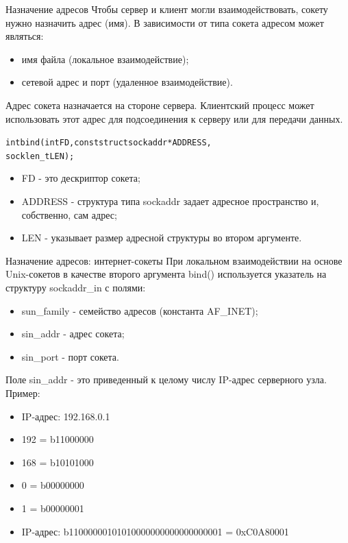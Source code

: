 \documentclass{beamer}
\begin{document}
\begin{frame}[fragile]{Назначение адресов}
	Чтобы сервер и клиент могли взаимодействовать, сокету нужно назначить адрес (имя). 
	В зависимости от типа сокета адресом может являться:
	\begin{itemize}
		\item имя файла (локальное взаимодействие);
		\item сетевой адрес и порт (удаленное взаимодействие).
	\end{itemize}
	Адрес сокета назначается на стороне сервера. 
	Клиентский процесс может использовать этот адрес для подсоединения к серверу или для передачи данных.
	\begin{alltt}
		int bind (int FD, const struct sockaddr * ADDRESS, 
		          socklen_t LEN);
	\end{alltt}
	\begin{itemize}
		\item FD - это дескриптор сокета;
		\item ADDRESS - структура типа sockaddr задает адресное пространство и, собственно, сам адрес;
		\item LEN - указывает размер адресной структуры во втором аргументе.		
	\end{itemize}
\end{frame}

\begin{frame}[fragile]{Назначение адресов: интернет-сокеты}
	При локальном взаимодействии на основе Unix-сокетов в качестве второго аргумента bind() используется указатель на структуру sockaddr\_in с полями: 
	\begin{itemize}
		\item sun\_family - семейство адресов (константа AF\_INET);
		\item sin\_addr - адрес сокета;
		\item sin\_port - порт сокета.
	\end{itemize}
	Поле sin\_addr - это приведенный к целому числу IP-адрес серверного узла. Пример:
	\begin{itemize}
		\item IP-адрес: 192.168.0.1
		\item 192 = b11000000		
		\item 168 = b10101000		
		\item   0 = b00000000		
		\item   1 = b00000001						
		\item IP-адрес: b11000000101010000000000000000001 = 0xC0A80001
	\end{itemize}	
\end{frame}
\end{document}

